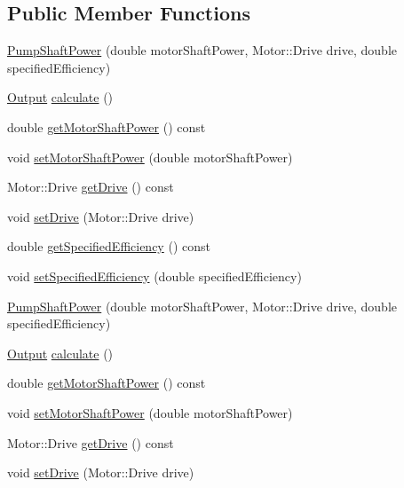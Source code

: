 \subsection*{Public Member Functions}
\begin{DoxyCompactItemize}
\item 
\hyperlink{class_pump_shaft_power_a7eea468dbb3efe1f0e8ae77a2d16efe2}{Pump\+Shaft\+Power} (double motor\+Shaft\+Power, Motor\+::\+Drive drive, double specified\+Efficiency)
\item 
\hyperlink{struct_pump_shaft_power_1_1_output}{Output} \hyperlink{class_pump_shaft_power_a0937a4e2e68682658a33ee4ea4ce00d8}{calculate} ()
\item 
double \hyperlink{class_pump_shaft_power_acb91eadb960f946ffee5373d4839a5be}{get\+Motor\+Shaft\+Power} () const
\item 
void \hyperlink{class_pump_shaft_power_a77b8c621c7c92841dbd00112437c413b}{set\+Motor\+Shaft\+Power} (double motor\+Shaft\+Power)
\item 
Motor\+::\+Drive \hyperlink{class_pump_shaft_power_a382653196fd65562cd3823049ab7573a}{get\+Drive} () const
\item 
void \hyperlink{class_pump_shaft_power_a5cbcf0acd63ae4a2ffe9a5c13ba73a3a}{set\+Drive} (Motor\+::\+Drive drive)
\item 
double \hyperlink{class_pump_shaft_power_a93c70d2b6f70d6d98b97859fc095193a}{get\+Specified\+Efficiency} () const
\item 
void \hyperlink{class_pump_shaft_power_a7d2c64ba11fb287d9b46f7d0890ee988}{set\+Specified\+Efficiency} (double specified\+Efficiency)
\item 
\hyperlink{class_pump_shaft_power_a7eea468dbb3efe1f0e8ae77a2d16efe2}{Pump\+Shaft\+Power} (double motor\+Shaft\+Power, Motor\+::\+Drive drive, double specified\+Efficiency)
\item 
\hyperlink{struct_pump_shaft_power_1_1_output}{Output} \hyperlink{class_pump_shaft_power_a5398dac8dedd059b0eefdcfe8cdbda60}{calculate} ()
\item 
double \hyperlink{class_pump_shaft_power_acb91eadb960f946ffee5373d4839a5be}{get\+Motor\+Shaft\+Power} () const
\item 
void \hyperlink{class_pump_shaft_power_a77b8c621c7c92841dbd00112437c413b}{set\+Motor\+Shaft\+Power} (double motor\+Shaft\+Power)
\item 
Motor\+::\+Drive \hyperlink{class_pump_shaft_power_a382653196fd65562cd3823049ab7573a}{get\+Drive} () const
\item 
void \hyperlink{class_pump_shaft_power_a5cbcf0acd63ae4a2ffe9a5c13ba73a3a}{set\+Drive} (Motor\+::\+Drive drive)

\end{DoxyCompactItemize}
